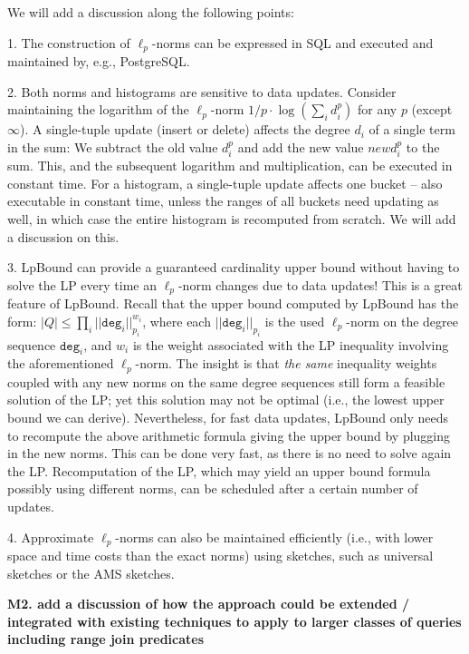 {
\color{blue}
We will add a discussion along the following points:

1. The construction of $\ell_p$-norms can be expressed in SQL and executed and maintained by, e.g., PostgreSQL. 

2. Both norms and histograms are sensitive to data updates. Consider maintaining the logarithm of the $\ell_p$-norm $1/p\cdot\log (\sum_i d_i^p)$ for any $p$ (except $\infty$). A single-tuple update (insert or delete) affects the degree $d_i$ of a single term in the sum: We subtract the old value $d_i^p$ and add the new value $newd_i^p$ to the sum. This, and the subsequent logarithm and multiplication, can be executed in constant time. For a histogram, a single-tuple update affects one bucket -- also executable in constant time, unless the ranges of all buckets need updating as well, in which case the entire histogram is recomputed from scratch. We will add a discussion on this.

3. LpBound can provide a guaranteed cardinality upper bound without having to solve the LP every time an $\ell_p$-norm changes due to data updates! This is a great feature of LpBound. Recall that the upper bound computed by LpBound has the form:
$|Q| \leq \prod_i ||\texttt{deg}_i||_{p_i}^{w_i}$,
where each $||\texttt{deg}_i||_{p_i}$ is the used $\ell_p$-norm on the degree sequence $\texttt{deg}_i$, and $w_i$ is the weight associated with the LP inequality involving the aforementioned $\ell_p$-norm. The insight is that {\em the same} inequality weights coupled with any new norms on the same degree sequences still form a feasible solution of the LP; yet this solution may not be optimal (i.e., the lowest upper bound we can derive). Nevertheless, for fast data updates, LpBound only needs to recompute the above arithmetic formula giving the upper bound by plugging in the new norms. This can be done very fast, as there is no need to solve again the LP. Recomputation of the LP, which may yield an upper bound formula possibly using different norms, can be scheduled after a certain number of updates.

4. Approximate $\ell_p$-norms can also be maintained efficiently (i.e., with lower space and time costs than the exact norms) using sketches, such as universal sketches or the AMS sketches.
}

\vspace{0.5em}\noindent
\textbf{
M2. add a discussion of how the approach could be extended / integrated with existing techniques to apply to larger classes of queries including range join predicates 
}

